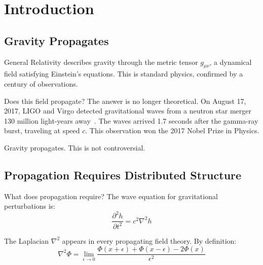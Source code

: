 \documentclass[aps,prd,preprint,superscriptaddress,showpacs,preprintnumbers,amsmath,amssymb,nofootinbib]{revtex4-2}
\begin{document}

\maketitle

\newpage
\tableofcontents

\newpage

\section{Introduction}
\label{sec:intro}

\subsection{Gravity Propagates}
\label{subsec:propagates}

General Relativity describes gravity through the metric tensor $g_{\mu\nu}$, a dynamical field satisfying Einstein's equations. This is standard physics, confirmed by a century of observations.

Does this field propagate? The answer is no longer theoretical. On August 17, 2017, LIGO and Virgo detected gravitational waves from a neutron star merger 130 million light-years away~\cite{gw170817}. The waves arrived 1.7 seconds after the gamma-ray burst, traveling at speed $c$. This observation won the 2017 Nobel Prize in Physics.

Gravity propagates. This is not controversial.

\subsection{Propagation Requires Distributed Structure}
\label{subsec:distributed}

What does propagation require? The wave equation for gravitational perturbations is:
\begin{equation}
\frac{\partial^2 h}{\partial t^2} = c^2 \nabla^2 h
\end{equation}

The Laplacian $\nabla^2$ appears in every propagating field theory. By definition:
\begin{equation}
\nabla^2 \Phi = \lim_{\epsilon \to 0} \frac{\Phi(x+\epsilon) + \Phi(x-\epsilon) - 2\Phi(x)}{\epsilon^2}
\end{equation}
\end{document}
